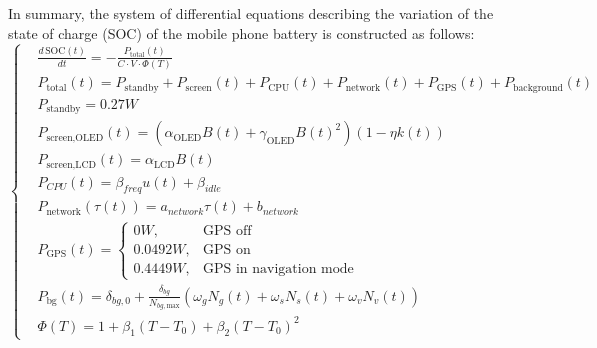\documentclass{mcmthesis}  %
\begin{document}
	In summary, the system of differential equations describing the variation of the state of charge (SOC) of the mobile phone battery is constructed as follows:
	\begin{equation}
		\left\{
		\begin{aligned}
			&\frac{d\,\text{SOC}(t)}{dt} = -\frac{P_{\text{total}}(t)}{C \cdot V \cdot \Phi(T)}
			\\
			&P_{\text{total}}(t) = P_{\text{standby}} + P_{\text{screen}}(t) + P_{\text{CPU}}(t) + P_{\text{network}}(t) + P_{\text{GPS}}(t) + P_{\text{background}}(t) \\
			&P_{\text{standby}}=0.27W
			\\
			&P_{\text{screen,OLED}}(t) = \left( \alpha_{\text{OLED}} B(t) + \gamma_{\text{OLED}} B(t)^2 \right) \left( 1 - \eta k(t) \right)
			\\
			&P_{\text{screen,LCD}}(t) = \alpha_{\text{LCD}} B(t) 
			\\
			&P_{CPU}(t)=\beta_{freq}u(t)+\beta_{idle} 
			\\
			&P_{\text{network}}(\tau(t)) = a_{network}\tau(t) + b_{network}
			\\
			&P_{\text{GPS}}(t) =
			\begin{cases}
				0W, & \text{GPS off} \\
				0.0492W, & \text{GPS on} \\
				0.4449W, & \text{GPS in navigation mode}
			\end{cases}
			\\
			&P_{\text{bg}}(t) = \delta_{bg,0} + \frac{\delta_{bg}}{N_{bg,\text{max}}} \left( \omega_g N_g(t) + \omega_s N_s(t) + \omega_v N_v(t) \right)
			\\
			&\Phi(T) = 1 + \beta_1(T - T_0) + \beta_2(T - T_0)^2
		\end{aligned}
		\right.
	\end{equation}
	
\end{document}
